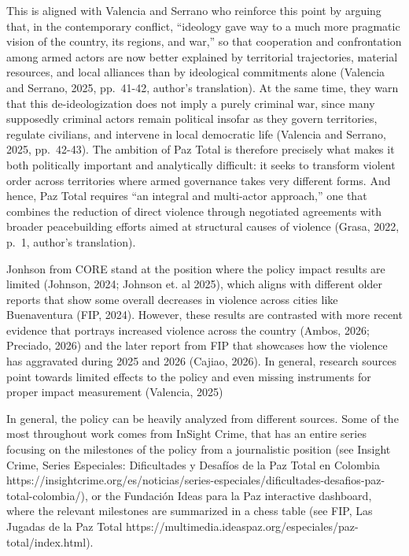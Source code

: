 \documentclass[11pt]{article}
\begin{document}
This is aligned with Valencia and Serrano who reinforce this point by arguing that, in the contemporary conflict, ``ideology gave way to a much more pragmatic vision of the country, its regions, and war,'' so that cooperation and confrontation among armed actors are now better explained by territorial trajectories, material resources, and local alliances than by ideological commitments alone (Valencia and Serrano, 2025, pp.~41-42, author's translation). At the same time, they warn that this de-ideologization does not imply a purely criminal war, since many supposedly criminal actors remain political insofar as they govern territories, regulate civilians, and intervene in local democratic life (Valencia and Serrano, 2025, pp.~42-43). The ambition of Paz Total is therefore precisely what makes it both politically important and analytically difficult: it seeks to transform violent order across territories where armed governance takes very different forms. And hence,  Paz Total requires ``an integral and multi-actor approach,'' one that combines the reduction of direct violence through negotiated agreements with broader peacebuilding efforts aimed at structural causes of violence (Grasa, 2022, p.~1, author's translation).

Jonhson from CORE stand at the position where the policy impact results are limited (Johnson, 2024; Johnson et. al 2025), which aligns with different older reports that show some overall decreases in violence across cities like Buenaventura (FIP, 2024). However, these results are contrasted with more recent evidence that portrays increased violence across the country (Ambos, 2026; Preciado, 2026) and the later report from FIP that showcases how the violence has aggravated during 2025 and 2026 (Cajiao, 2026). In general, research sources point towards limited effects to the policy and even missing instruments for proper impact measurement (Valencia, 2025)

In general, the policy can be heavily analyzed from different sources. Some of the most throughout work comes from InSight Crime, that has an entire series focusing on the milestones of the policy from a journalistic position (see Insight Crime, Series Especiales: Dificultades y Desafíos de la Paz Total en Colombia https://insightcrime.org/es/noticias/series-especiales/dificultades-desafios-paz-total-colombia/), or the Fundación Ideas para la Paz interactive dashboard, where the relevant milestones are summarized in a chess table (see FIP, Las Jugadas de la Paz Total https://multimedia.ideaspaz.org/especiales/paz-total/index.html). 
\end{document}
